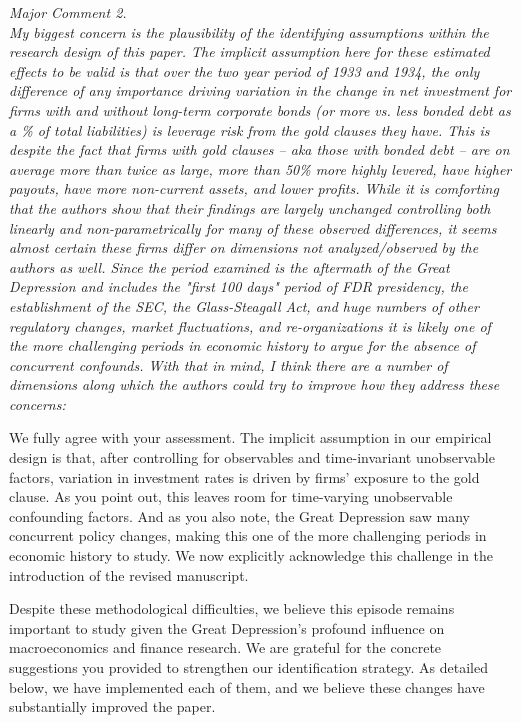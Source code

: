 \noindent \textit{\textcolor{red!60!black}{Major Comment 2.\\ My biggest concern is the plausibility of the identifying assumptions within the research design of this paper. The implicit assumption here for these estimated effects to be valid is that over the two year period of 1933 and 1934, the only difference of any importance driving variation in the change in net investment for firms with and without long-term corporate bonds (or more vs. less bonded debt as a \% of total liabilities) is leverage risk from the gold clauses they have. This is despite the fact that firms with gold clauses – aka those with bonded debt – are on average more than twice as large, more than 50\% more highly levered, have higher payouts, have more non-current assets, and lower profits. While it is comforting that the authors show that their findings are largely unchanged controlling both linearly and non-parametrically for many of these observed differences, it seems almost certain these firms differ on dimensions not analyzed/observed by the authors as well. Since the period examined is the aftermath of the Great Depression and includes the "first 100 days" period of FDR presidency, the establishment of the SEC, the Glass-Steagall Act, and huge numbers of other regulatory changes, market fluctuations, and re-organizations it is likely one of the more challenging periods in economic history to argue for the absence of concurrent confounds. With that in mind, I think there are a number of dimensions along which the authors could try to improve how they address these concerns:}}

\noindent We fully agree with your assessment. The implicit assumption in our empirical design is that, after controlling for observables and time-invariant unobservable factors, variation in investment rates is driven by firms' exposure to the gold clause. As you point out, this leaves room for time-varying unobservable confounding factors. And as you also note, the Great Depression saw many concurrent policy changes, making this one of the more challenging periods in economic history to study. We now explicitly acknowledge this challenge in the introduction of the revised manuscript.

Despite these methodological difficulties, we believe this episode remains important to study given the Great Depression's profound influence on macroeconomics and finance research. We are grateful for the concrete suggestions you provided to strengthen our identification strategy. As detailed below, we have implemented each of them, and we believe these changes have substantially improved the paper.

